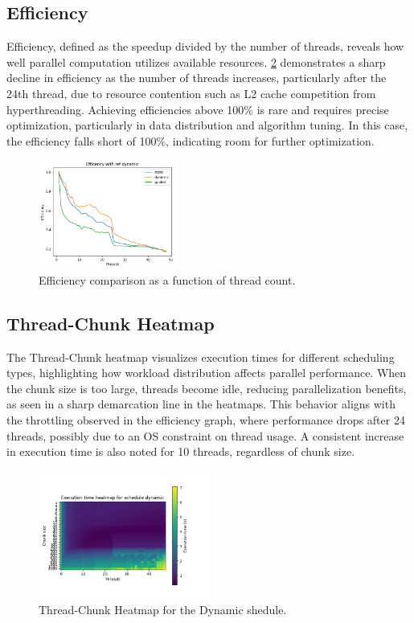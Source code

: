 \documentclass[english,11pt]{article}
\begin{document}
\subsection{Efficiency}
Efficiency, defined as the speedup divided by the number of threads, reveals how well parallel computation utilizes available resources. \ref{fig:efficiency} demonstrates a sharp decline in efficiency as the number of threads increases, particularly after the 24th thread, due to resource contention such as L2 cache competition from hyperthreading. Achieving efficiencies above 100\% is rare and requires precise optimization, particularly in data distribution and algorithm tuning. In this case, the efficiency falls short of 100\%, indicating room for further optimization.

\begin{figure}[h!]
    \centering
    \includegraphics[width=0.4\textwidth]{graph/Efficiency.png}
    \caption{Efficiency comparison as a function of thread count.}
    \label{fig:efficiency}
\end{figure}


\subsection{Thread-Chunk Heatmap}
The Thread-Chunk heatmap visualizes execution times for different scheduling types, highlighting how workload distribution affects parallel performance. When the chunk size is too large, threads become idle, reducing parallelization benefits, as seen in a sharp demarcation line in the heatmaps. This behavior aligns with the throttling observed in the efficiency graph, where performance drops after 24 threads, possibly due to an OS constraint on thread usage. A consistent increase in execution time is also noted for 10 threads, regardless of chunk size.

\begin{figure}[h!]
    \centering
    \includegraphics[width=0.5\textwidth]{graph/Heat_dynamic.png}
    \caption{Thread-Chunk Heatmap for the Dynamic shedule.}
    \label{fig:efficiency}
\end{figure}
\end{document}
